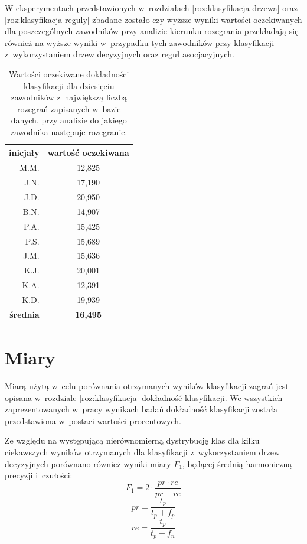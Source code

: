 \documentclass[a4paper,twoside,12pt]{book}
\begin{document}
W eksperymentach przedstawionych w~rozdziałach \ref{roz:klasyfikacja-drzewa} oraz \ref{roz:klasyfikacja-reguly} zbadane zostało czy wyższe wyniki wartości oczekiwanych dla poszczególnych zawodników przy analizie kierunku rozegrania przekładają się również na wyższe wyniki w~przypadku tych zawodników przy klasyfikacji z~wykorzystaniem drzew decyzyjnych oraz reguł asocjacyjnych.

\begin{table}
\centering
\caption{Wartości oczekiwane dokładności klasyfikacji dla dziesięciu zawodników z~największą liczbą rozegrań zapisanych w~bazie danych, przy analizie do jakiego zawodnika następuje rozegranie.}
\label{tab:prawdopodobienstwoRozegranieZawodnicy}
\begin{tabular}{rc}
\toprule
{inicjały} & {wartość oczekiwana} \\
\midrule
M.M. & 12,825 \\ 
J.N. & 17,190 \\ 
J.D. & 20,950 \\ 
B.N. & 14,907 \\ 
P.A. & 15,425 \\ 
P.S. & 15,689 \\
J.M. & 15,636 \\
K.J. & 20,001 \\
K.A. & 12,391 \\ 
K.D. & 19,939 \\ 
\midrule
\textbf{średnia} & \textbf{16,495} \\ 
\bottomrule
\end{tabular}
\end{table}

\section{Miary}

Miarą użytą w~celu porównania otrzymanych wyników klasyfikacji zagrań jest opisana w~rozdziale \ref{roz:klasyfikacja} dokładność klasyfikacji.
We wszystkich zaprezentowanych w~pracy wynikach badań dokładność klasyfikacji została przedstawiona w~postaci wartości procentowych.

Ze względu na występującą nierównomierną dystrybucję klas dla kilku ciekawszych wyników otrzymanych dla klasyfikacji z~wykorzystaniem drzew decyzyjnych porównano również wyniki miary $F_1$, będącej średnią harmoniczną precyzji i~czułości:
\begin{equation}
F_1 = 2 \cdot \frac{pr \cdot re}{pr + re}
\end{equation}
\begin{equation}
pr = \frac{t_p}{t_p + f_p}
\end{equation}
\begin{equation}
re = \frac{t_p}{t_p + f_n}
\end{equation}
\end{document}
